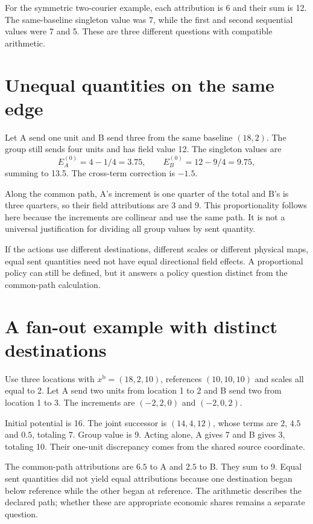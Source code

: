 For the symmetric two-courier example, each attribution is 6 and their sum is 12. The same-baseline singleton value was 7, while the first and second sequential values were 7 and 5. These are three different questions with compatible arithmetic.

\section{Unequal quantities on the same edge}
Let A send one unit and B send three from the same baseline $(18,2)$. The group still sends four units and has field value 12. The singleton values are
\[
 E_A^{(0)}=4-1/4=3.75,\qquad
 E_B^{(0)}=12-9/4=9.75,
\]
summing to 13.5. The cross-term correction is $-1.5$.

Along the common path, A's increment is one quarter of the total and B's is three quarters, so their field attributions are 3 and 9. This proportionality follows here because the increments are collinear and use the same path. It is not a universal justification for dividing all group values by sent quantity.

If the actions use different destinations, different scales or different physical maps, equal sent quantities need not have equal directional field effects. A proportional policy can still be defined, but it answers a policy question distinct from the common-path calculation.

\section{A fan-out example with distinct destinations}
Use three locations with $x^{\mathrm{b}}=(18,2,10)$, references $(10,10,10)$ and scales all equal to 2. Let A send two units from location 1 to 2 and B send two from location 1 to 3. The increments are $(-2,2,0)$ and $(-2,0,2)$.

Initial potential is 16. The joint successor is $(14,4,12)$, whose terms are $2$, $4.5$ and $0.5$, totaling 7. Group value is 9. Acting alone, A gives 7 and B gives 3, totaling 10. Their one-unit discrepancy comes from the shared source coordinate.

The common-path attributions are $6.5$ to A and $2.5$ to B. They sum to 9. Equal sent quantities did not yield equal attributions because one destination began below reference while the other began at reference. The arithmetic describes the declared path; whether these are appropriate economic shares remains a separate question.

